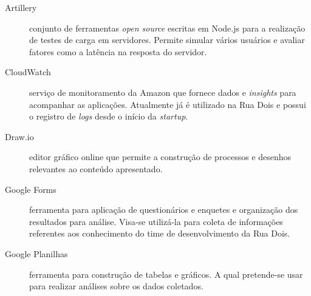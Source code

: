 \begin{description}
    \item[Artillery] conjunto de ferramentas \textit{open source} escritas em Node.js
    para a realização de testes de carga em servidores. Permite simular vários usuários
    e avaliar fatores como a latência na resposta do servidor.
    \item[CloudWatch] serviço de monitoramento da Amazon que fornece dados e
    \textit{insights} para acompanhar as aplicações. Atualmente já é utilizado na
    Rua Dois e possui o registro de \textit{logs} desde o início da \textit{startup}.
    \item[Draw.io] editor gráfico online que permite a construção de processos e
    desenhos relevantes ao conteúdo apresentado.
    \item[Google Forms] ferramenta para aplicação de questionários e enquetes
    e organização dos resultados para análise. Visa-se utilizá-la para coleta
    de informações referentes aos conhecimento do time de desenvolvimento da Rua Dois.
    \item[Google Planilhas] ferramenta para construção de tabelas e gráficos.
    A qual pretende-se usar para realizar análises sobre os dados coletados.
\end{description}

